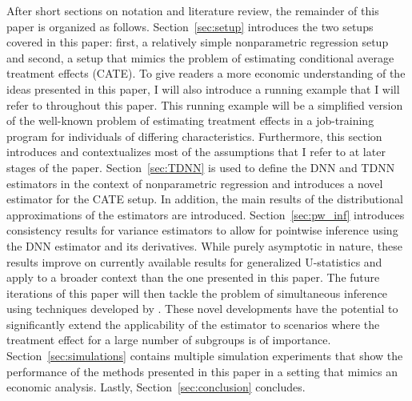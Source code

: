 After short sections on notation and literature review, the remainder of this paper is organized as follows.
Section~\ref{sec:setup} introduces the two setups covered in this paper: first, a relatively simple nonparametric regression setup and second, a setup that mimics the problem of estimating conditional average treatment effects (CATE).
To give readers a more economic understanding of the ideas presented in this paper, I will also introduce a running example that I will refer to throughout this paper.
This running example will be a simplified version of the well-known problem of estimating treatment effects in a job-training program for individuals of differing characteristics.
Furthermore, this section introduces and contextualizes most of the assumptions that I refer to at later stages of the paper.
Section~\ref{sec:TDNN} is used to define the DNN and TDNN estimators in the context of nonparametric regression and introduces a novel estimator for the CATE setup.
In addition, the main results of the distributional approximations of the estimators are introduced.
Section~\ref{sec:pw_inf} introduces consistency results for variance estimators to allow for pointwise inference using the DNN estimator and its derivatives.
While purely asymptotic in nature, these results improve on currently available results for generalized U-statistics and apply to a broader context than the one presented in this paper.
The future iterations of this paper will then tackle the problem of simultaneous inference using techniques developed by \citet{ritzwoller_simultaneous_2024}.
These novel developments have the potential to significantly extend the applicability of the estimator to scenarios where the treatment effect for a large number of subgroups is of importance.
Section~\ref{sec:simulations} contains multiple simulation experiments that show the performance of the methods presented in this paper in a setting that mimics an economic analysis.
Lastly, Section~\ref{sec:conclusion} concludes.

